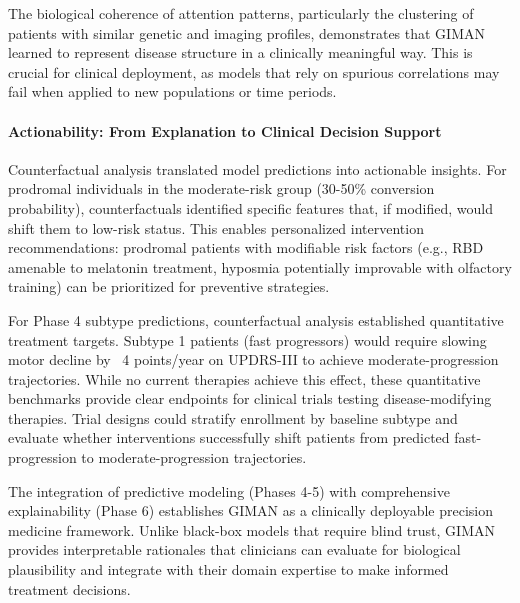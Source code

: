 The biological coherence of attention patterns, particularly the clustering of patients with similar genetic and imaging profiles, demonstrates that GIMAN learned to represent disease structure in a clinically meaningful way. This is crucial for clinical deployment, as models that rely on spurious correlations may fail when applied to new populations or time periods.

\paragraph{Actionability: From Explanation to Clinical Decision Support}
Counterfactual analysis translated model predictions into actionable insights. For prodromal individuals in the moderate-risk group (30-50\% conversion probability), counterfactuals identified specific features that, if modified, would shift them to low-risk status. This enables personalized intervention recommendations: prodromal patients with modifiable risk factors (e.g., RBD amenable to melatonin treatment, hyposmia potentially improvable with olfactory training) can be prioritized for preventive strategies.

For Phase 4 subtype predictions, counterfactual analysis established quantitative treatment targets. Subtype 1 patients (fast progressors) would require slowing motor decline by ~4 points/year on UPDRS-III to achieve moderate-progression trajectories. While no current therapies achieve this effect, these quantitative benchmarks provide clear endpoints for clinical trials testing disease-modifying therapies. Trial designs could stratify enrollment by baseline subtype and evaluate whether interventions successfully shift patients from predicted fast-progression to moderate-progression trajectories.

The integration of predictive modeling (Phases 4-5) with comprehensive explainability (Phase 6) establishes GIMAN as a clinically deployable precision medicine framework. Unlike black-box models that require blind trust, GIMAN provides interpretable rationales that clinicians can evaluate for biological plausibility and integrate with their domain expertise to make informed treatment decisions.

